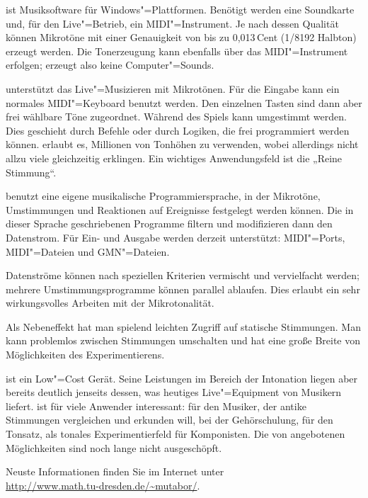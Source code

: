 \mutabor[~3] ist Musiksoftware für Windows"=Plattformen.  Benötigt
werden eine Soundkarte und, für den Live"=Betrieb, ein MIDI"=Instrument.
Je nach dessen Qualität können Mikrotöne mit einer
Genauigkeit von bis zu 0,013\,Cent (1/8192 Halbton) erzeugt werden. Die
Tonerzeugung kann ebenfalls über das MIDI"=Instrument erfolgen;
\mutabor{} erzeugt also keine Computer"=Sounds.

\mutabor{} unterstützt das Live"=Musizieren mit Mikrotönen.  Für die
Eingabe kann ein normales MIDI"=Keyboard benutzt werden.  Den einzelnen
Tasten sind dann aber frei wählbare Töne zugeordnet.  Während des
Spiels kann umgestimmt werden. Dies geschieht durch Befehle oder durch
Logiken, die frei programmiert werden können. \mutabor{} erlaubt es,
Millionen von Tonhöhen zu verwenden, wobei allerdings nicht
allzu viele gleichzeitig erklingen. Ein wichtiges Anwendungsfeld ist
die „Reine Stimmung“.

\mutabor{} benutzt eine eigene musikalische Programmiersprache, in der
Mikrotöne, Umstimmungen und Reaktionen auf Ereignisse festgelegt
werden können. Die in dieser Sprache geschriebenen Programme filtern
und modifizieren dann den Datenstrom. Für Ein- und Ausgabe werden
derzeit unterstützt: MIDI"=Ports, MIDI"=Dateien und GMN"=Dateien.

Datenströme können nach speziellen Kriterien vermischt und
vervielfacht werden; mehrere Umstimmungsprogramme können parallel
ablaufen. Dies erlaubt ein sehr wirkungsvolles Arbeiten mit der
Mikrotonalität.

Als Nebeneffekt hat man spielend leichten Zugriff auf statische 
Stimmungen. Man kann problemlos zwischen Stimmungen umschalten 
und hat eine große Breite von Möglichkeiten des Experimentierens.


\mutabor{} ist ein Low"=Cost Gerät. Seine Leistungen im 
Bereich der Intonation liegen aber bereits deutlich jenseits 
dessen, was heutiges Live"=Equipment von Musikern liefert. \mutabor{} 
ist für viele Anwender interessant: für den Musiker, der 
antike Stimmungen vergleichen und erkunden will, bei der Gehörschulung, 
für den Tonsatz, als tonales Experimentierfeld für Komponisten. 
Die von \mutabor{} angebotenen Möglichkeiten sind noch lange 
nicht ausgeschöpft.

\begin{center}
Neuste Informationen finden Sie im Internet unter\\
{\url{http://www.math.tu-dresden.de/~mutabor/}}.
\end{center}

